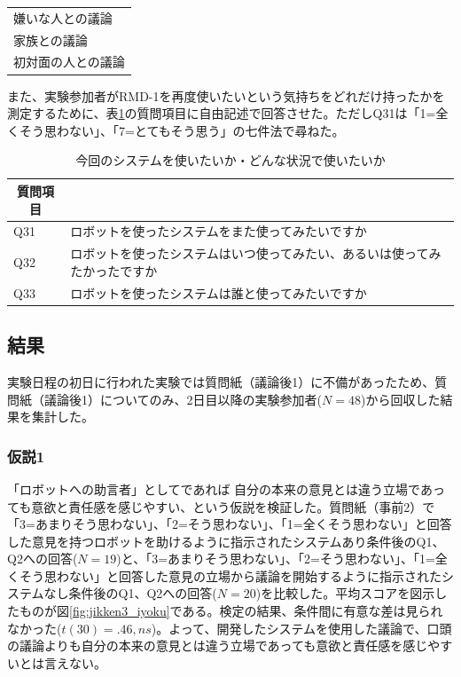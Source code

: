 \documentclass[11pt, a4paper]{jreport} %
\begin{document}
\begin{table}[]
\begin{tabular}{@{}l@{}}
	\hspace{0.5cm}嫌いな人との議論                                                                                 \\
	\hspace{0.5cm}家族との議論                                                                                   \\
	\hspace{0.5cm}初対面の人との議論                                                                                \\ \bottomrule
\end{tabular}
\end{table}




また、実験参加者がRMD-1を再度使いたいという気持ちをどれだけ持ったかを測定するために、表\ref{tab:intention}の質問項目に自由記述で回答させた。ただしQ31は「1=全くそう思わない」、「7=とてもそう思う」の七件法で尋ねた。
\begin{table}[H]
\caption{今回のシステムを使いたいか・どんな状況で使いたいか}
\centering
\label{tab:intention}
\begin{tabular}{@{}ll@{}}
\toprule
\multicolumn{1}{c}{質問項目}              \\ \midrule
Q31&ロボットを使ったシステムをまた使ってみたいですか\\
Q32&ロボットを使ったシステムはいつ使ってみたい、あるいは使ってみたかったですか\\
Q33&ロボットを使ったシステムは誰と使ってみたいですか \\ \bottomrule
\end{tabular}
\end{table}

\subsection{結果}
実験日程の初日に行われた実験では質問紙（議論後1）に不備があったため、質問紙（議論後1）についてのみ、2日目以降の実験参加者($N=48$)から回収した結果を集計した。

\subsubsection*{仮説1}
「ロボットへの助言者」としてであれば
自分の本来の意見とは違う立場であっても意欲と責任感を感じやすい、という仮説を検証した。質問紙（事前2）で「3=あまりそう思わない」、「2=そう思わない」、「1=全くそう思わない」と回答した意見を持つロボットを助けるように指示されたシステムあり条件後のQ1、Q2への回答($N=19$)と、「3=あまりそう思わない」、「2=そう思わない」、「1=全くそう思わない」と回答した意見の立場から議論を開始するように指示されたシステムなし条件後のQ1、Q2への回答($N=20$)を比較した。平均スコアを図示したものが図\ref{fig:jikken3_iyoku}である。検定の結果、条件間に有意な差は見られなかった($t(30)= .46, ns$)。よって、開発したシステムを使用した議論で、口頭の議論よりも自分の本来の意見とは違う立場であっても意欲と責任感を感じやすいとは言えない。
\end{document}
